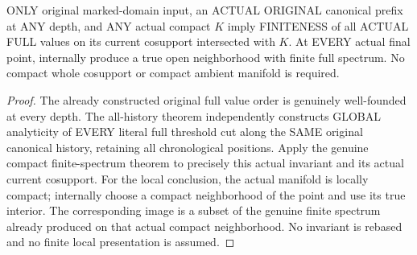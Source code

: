 \begin{theorem}
\label{hir:original-all-depth-actual-full-compact-local-finite-values}
\leanok
ONLY original marked-domain input, an ACTUAL ORIGINAL canonical prefix at
ANY depth, and ANY actual compact $K$ imply FINITENESS of all ACTUAL FULL
values on its current cosupport intersected with $K$. At EVERY actual final
point, internally produce a true open neighborhood with finite full spectrum.
No compact whole cosupport or compact ambient manifold is required.
\end{theorem}
\begin{proof}
The already constructed original full value order is genuinely well-founded
at every depth. The all-history theorem independently constructs GLOBAL
analyticity of EVERY literal full threshold cut along the SAME original
canonical history, retaining all chronological positions. Apply the genuine
compact finite-spectrum theorem to precisely this actual invariant and its
actual current cosupport. For the local conclusion, the actual manifold is
locally compact; internally choose a compact neighborhood of the point and
use its true interior. The corresponding image is a subset of the genuine
finite spectrum already produced on that actual compact neighborhood.
No invariant is rebased and no finite local presentation is assumed.
\end{proof}

